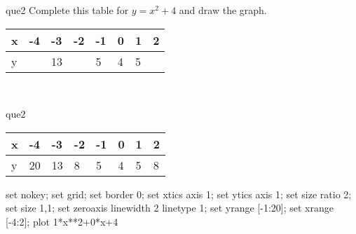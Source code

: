 \documentclass[13.5pt, varwidth=true]{beamer}
\begin{document}
\begin{frame}[shrink=19,fragile]
	\begin{beamercolorbox}[rounded=true, left, shadow=true,wd=14.8cm]{que2}
		 Complete this table for $y = x^{2} + 4$ and draw the graph. \\[0.3cm] \renewcommand{\arraystretch}{1.2}\begin{tabular}{|C|C|C|C|C|C|C|C|} \hline x & -4 & -3 & -2 & -1 & 0 & 1 & 2 \\ \hline y &  & 13 &  & 5 & 4 & 5 & \\ \hline \end{tabular}\\[0.3cm]
	\end{beamercolorbox}
\end{frame}
\begin{frame}[shrink=19,fragile]
	\begin{beamercolorbox}[rounded=true, left, shadow=true,wd=14.8cm]{que2}
		\renewcommand{\arraystretch}{1.2}\begin{tabular}{|C|C|C|C|C|C|C|C|} \hline x & -4 & -3 & -2 & -1 & 0 & 1 & 2 \\ \hline y & 20 & 13 & 8 & 5 & 4 & 5 & 8\\ \hline \end{tabular}\begin{gnuplot}[terminal=pdf] set nokey; set grid; set border 0; set xtics axis 1; set ytics axis 1; set size ratio 2; set size 1,1; set zeroaxis linewidth 2 linetype 1; set yrange [-1:20]; set xrange [-4:2]; plot 1*x**2+0*x+4 \end{gnuplot}
	\end{beamercolorbox}
\end{frame}
\end{document}
